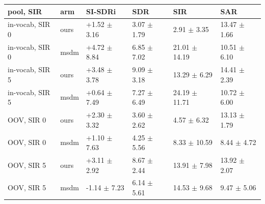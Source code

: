 \begin{tabular}{llllll}
\toprule
pool, SIR & arm & SI-SDRi & SDR & SIR & SAR\\
\midrule
in-vocab, SIR 0 & ours & +1.52 $\pm$ 3.16 & 3.07 $\pm$ 1.79 & 2.91 $\pm$ 3.35 & 13.47 $\pm$ 1.66\\
in-vocab, SIR 0 & msdm & +4.72 $\pm$ 8.84 & 6.85 $\pm$ 7.02 & 21.01 $\pm$ 14.19 & 10.51 $\pm$ 6.10\\
in-vocab, SIR 5 & ours & +3.48 $\pm$ 3.78 & 9.09 $\pm$ 3.18 & 13.29 $\pm$ 6.29 & 14.41 $\pm$ 2.39\\
in-vocab, SIR 5 & msdm & +0.64 $\pm$ 7.49 & 7.27 $\pm$ 6.49 & 24.19 $\pm$ 11.71 & 10.72 $\pm$ 6.00\\
OOV, SIR 0 & ours & +2.30 $\pm$ 3.32 & 3.60 $\pm$ 2.62 & 4.57 $\pm$ 6.32 & 13.13 $\pm$ 1.79\\
OOV, SIR 0 & msdm & +1.10 $\pm$ 7.63 & 4.25 $\pm$ 5.56 & 8.33 $\pm$ 10.59 & 8.44 $\pm$ 4.72\\
OOV, SIR 5 & ours & +3.11 $\pm$ 2.92 & 8.67 $\pm$ 2.44 & 13.91 $\pm$ 7.98 & 13.92 $\pm$ 2.07\\
OOV, SIR 5 & msdm & -1.14 $\pm$ 7.23 & 6.14 $\pm$ 5.61 & 14.53 $\pm$ 9.68 & 9.47 $\pm$ 5.06\\
\bottomrule
\end{tabular}

